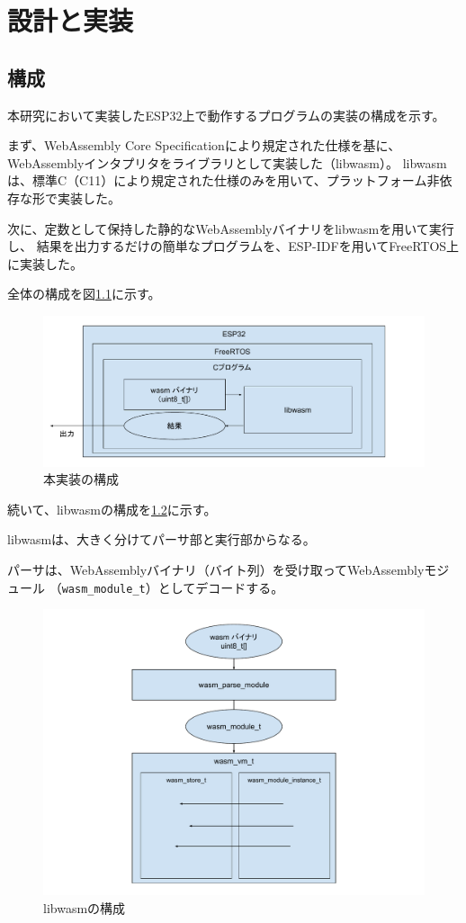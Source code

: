 \chapter{設計と実装}
\label{chap:implementation}

\section{構成}

本研究において実装したESP32上で動作するプログラムの実装の構成を示す。

まず、WebAssembly Core Specification\cite{wasm_spec}により規定された仕様を基に、
WebAssemblyインタプリタをライブラリとして実装した（libwasm）。
libwasmは、標準C（C11）により規定された仕様のみを用いて、プラットフォーム非依存な形で実装した。

次に、定数として保持した静的なWebAssemblyバイナリをlibwasmを用いて実行し、
結果を出力するだけの簡単なプログラムを、ESP-IDF\cite{esp_idf}を用いてFreeRTOS上に実装した。

全体の構成を図\ref{fig:esp32_libwasm}に示す。

\begin{figure}[htbp]
  \caption{本実装の構成}
  \label{fig:esp32_libwasm}
  \begin{center}
    \includegraphics[bb=0 0 800 300,width=12cm]{img/esp32_libwasm.pdf}
  \end{center}
\end{figure}

続いて、libwasmの構成を\ref{fig:libwasm_arch}に示す。

libwasmは、大きく分けてパーサ部と実行部からなる。

パーサは、WebAssemblyバイナリ（バイト列）を受け取ってWebAssemblyモジュール
（\verb|wasm_module_t|）としてデコードする。


\begin{figure}[htbp]
  \caption{libwasmの構成}
  \label{fig:libwasm_arch}
  \begin{center}
    \includegraphics[bb=0 0 800 600,width=12cm]{img/libwasm_arch.pdf}
  \end{center}
\end{figure}
